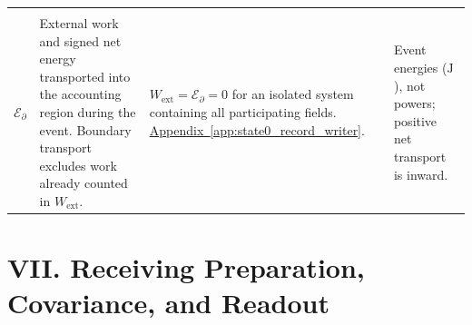\begin{longtable}{@{} c p{5.5cm} p{4cm} p{3.5cm} @{}}
\begin{tabular}[c]{@{}c@{}}
    $W_{\mathrm{ext}}$ \\
    $\mathcal E_{\partial}$
\end{tabular}
& {\raggedright
External work and signed net energy transported into the accounting
region during the event. Boundary transport excludes work already
counted in $W_{\mathrm{ext}}$.
\par}
& {\raggedright
$W_{\mathrm{ext}}=\mathcal E_{\partial}=0$ for an isolated system
containing all participating fields.
\newline
\hyperref[app:state0_record_writer]{Appendix~\ref*{app:state0_record_writer}}.
\par}
& {\raggedright
Event energies ($\mathrm J$), not powers;
positive net transport is inward.
\par} \\

\bottomrule
\end{longtable}

\vspace{1cm}
\section*{VII. Receiving Preparation, Covariance, and Readout}

